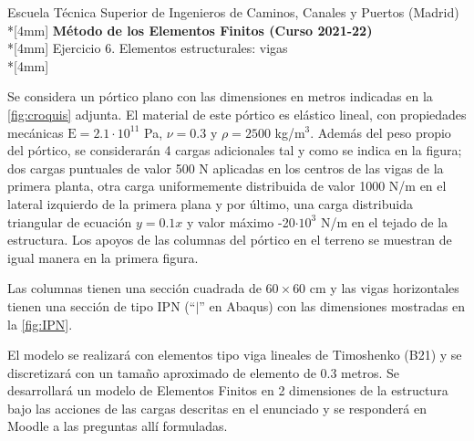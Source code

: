 \documentclass[a4paper,12pt]{article}
\begin{document}
\def\bm#1{{\mbox{\boldmath $#1$}}}
\def\eqdef{\buildrel \rm def \over =}
\def\signo{\mathop{\rm signo}\nolimits}

\mbox{}\vspace*{-20mm}

{\centering
{\small\sc Escuela Técnica Superior de Ingenieros de Caminos, Canales y Puertos (Madrid)}\\*[4mm]
{\Large\bf Método de los Elementos Finitos (Curso 2021-22)}\\*[4mm]
Ejercicio 6. Elementos estructurales: vigas \\*[4mm]
}


\noindent
Se considera un pórtico plano con las dimensiones en metros indicadas en la \cref{fig:croquis} adjunta. El material de este pórtico es elástico lineal, con propiedades mecánicas $\text{E}=2.1\cdot 10^{11}$ Pa, $\nu=0.3$ y $\rho=2500$ kg/m$^3$. Además del peso propio del pórtico, se considerarán 4 cargas adicionales tal y como se indica en la figura; dos cargas puntuales de valor 500 N aplicadas en los centros de las vigas de la primera planta, otra carga uniformemente distribuida de valor 1000 N/m en el lateral izquierdo de la primera plana y por último, una carga distribuida triangular de ecuación $y=0.1x$ y valor máximo -20$\cdot 10^{3}$ N/m en el tejado de la estructura. Los apoyos de las columnas del pórtico en el terreno se muestran de igual manera en la primera figura.

Las columnas tienen una sección cuadrada de $60 \times 60$ cm y las vigas horizontales tienen una sección de tipo IPN (``\(\mid\)'' en Abaqus) con las dimensiones mostradas en la \cref{fig:IPN}.


El modelo se realizará con elementos tipo viga lineales de Timoshenko (B21) y se discretizará con un tamaño aproximado de elemento de 0.3 metros. Se desarrollará un modelo de Elementos Finitos en 2 dimensiones de la estructura bajo las acciones de las cargas descritas en el enunciado y se responderá en Moodle a las preguntas allí formuladas.

\vspace{10mm}
\end{document}
